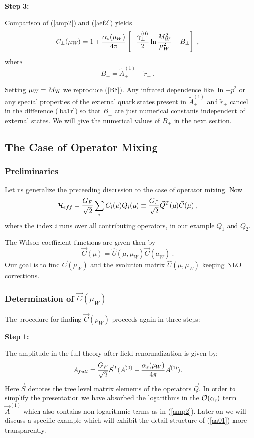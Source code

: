 \documentclass[12pt,rotate]{article}
\def\as{\alpha_s}
\newcommand{\mw}{M_{\rm W}}
\newcommand{\ord}{{\cal O}}
\begin{document}
\begin{itemize}
\begin{itemize}
\begin{itemize}
{\bf Step 3:}

Comparison of (\ref{amp2}) and (\ref{aef2}) yields 
\begin{equation}\label{cmw2}
 C_\pm(\mu_W)=1+{\as(\mu_W)\over 4\pi}\left[-{{\gamma^{(0)}_\pm}\over 2}
 \ln{M^2_W\over\mu^2_W}+B_\pm\right]~, \end{equation}
where
\begin{equation}\label{ba1r} B_\pm=\tilde A_\pm^{(1)}-\tilde r_\pm~.
 \end{equation}

Setting $\mu_W=\mw$ we reproduce (\ref{B8}).
Any infrared dependence like $\ln{-p^2}$ or any special properties
of the external quark states present in $\tilde A_\pm^{(1)}$ and 
$\tilde r_\pm$
cancel in the difference (\ref{ba1r}) so that $B_\pm$ are just  numerical 
constants independent of external states. We will give the numerical values of
$B_\pm$ in the next section.


\subsection{The Case of Operator Mixing}
\subsubsection{Preliminaries}
Let us generalize the preceeding discussion to the case of operator
mixing. Now
\begin{equation}\label{hqtc}
{\cal H}_{eff}={G_F\over\sqrt{2}}\sum_i C_i(\mu)Q_i(\mu)\equiv
  {G_F\over\sqrt{2}}\vec Q^T(\mu) \vec C(\mu)~,   \end{equation}
where the index $i$ runs over all contributing operators, in our
example $Q_1$ and $Q_2$. 

The Wilson coefficient functions are given then by
\begin{equation}\label{cucw}
\vec C(\mu)=\hat U(\mu, \mu_W)\vec C(\mu_W)~.
\end{equation}
Our goal is to find $\vec C(\mu_W)$ and the evolution matrix
$\hat U(\mu, \mu_W)$ keeping NLO corrections.   
\subsubsection{Determination of $\vec C(\mu_W)$}
The procedure for finding $\vec C(\mu_W)$ proceeds again in three
steps:

{\bf Step 1:}

The  amplitude in the full theory after
field renormalization is given by:
\begin{equation}\label{aa01} A_{full}=
{G_F\over\sqrt{2}}\vec S^T(\vec A^{(0)}
+{\as(\mu_W)\over 4\pi}\vec A^{(1)}).
\end{equation}
Here $\vec S$ denotes the tree level matrix elements of the
operators $\vec Q$. In order to simplify the presentation we
have absorbed the logarithms in the $\ord(\alpha_s)$ term
$\vec A^{(1)}$ which also contains non-logarithmic terms as in
(\ref{amp2}). Later on we will discuss a specific example which
will exhibit the detail structure of (\ref{aa01}) more transparently.


\end{itemize}
\end{itemize}
\end{itemize}
\end{document}
